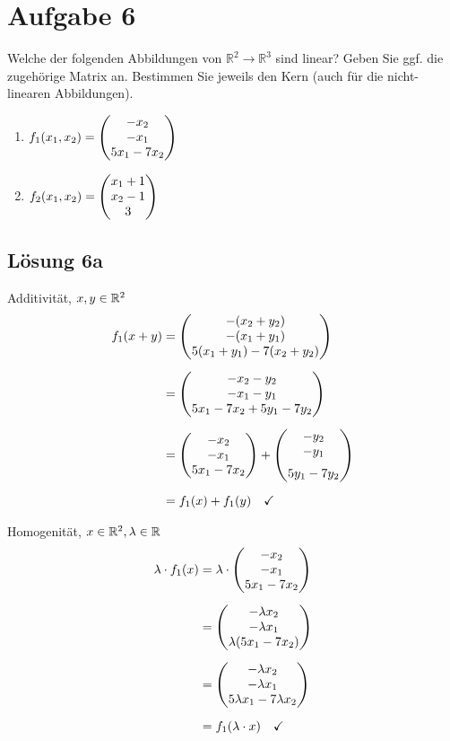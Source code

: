 \documentclass[main.tex]{subfiles}
\begin{document}
\section{Aufgabe 6}
Welche der folgenden Abbildungen von $\mathbb{R}^2 \to \mathbb{R}^3$ sind linear? Geben Sie ggf. die zugehörige Matrix an.
Bestimmen Sie jeweils den Kern (auch für die nicht-linearen Abbildungen).

\begin{enumerate}
    \item $f_1(x_1, x_2) = \vektor{ -x_2 \\ -x_1 \\ 5x_1 - 7x_2 }$
    \item $f_2(x_1, x_2) = \vektor{ x_1 + 1 \\ x_2 - 1 \\ 3 }$
\end{enumerate}

\subsection{Lösung 6a}
Additivität, $x, y \in \mathbb{R}^2$
\begin{align*}
    f_1(x + y) &= \vektor{ -(x_2 +y_2) \\ -(x_1 + y_1) \\ 5(x_1+y_1) - 7(x_2 + y_2) } \\[2mm]
    &= \vektor{ -x_2 -y_2 \\ -x_1 -y_1 \\ 5x_1 - 7x_2 + 5y_1 - 7y_2 } \\[2mm]
    &= \vektor{ -x_2 \\ -x_1 \\ 5x_1 - 7x_2 } + \vektor{ -y_2 \\ -y_1 \\[2mm] 5y_1 - 7y_2 } \\[2mm]
    &= f_1(x) + f_1(y) \quad \checkmark
\end{align*}

Homogenität, $x \in \mathbb{R}^2, \lambda \in \mathbb{R}$
\begin{align*}
    \lambda \cdot f_1(x) & = \lambda \cdot \vektor{ -x_2 \\ -x_1 \\ 5x_1 - 7x_2 } \\[2mm]
    & = \vektor{ -\lambda x_2 \\ -\lambda x_1 \\ \lambda (5x_1 - 7x_2) } \\[2mm]
    &= \vektor{-\lambda x_2 \\ -\lambda x_1 \\ 5\lambda x_1 - 7\lambda x_2}\\[2mm]
    &= f_1(\lambda \cdot x) \quad \checkmark
\end{align*}
\end{document}
